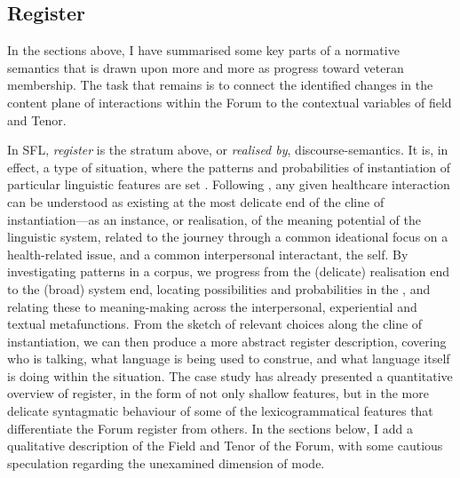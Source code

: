 \subsection{Register} \label{sect:discuss-register}

In the sections above, I have summarised some key parts of a normative semantics that is drawn upon more and more as  progress toward veteran membership. The task that remains is to connect the identified changes in the content plane of interactions within the \gls{Forum} to the contextual variables of field and Tenor.

In \gls{SFL}, \emph{register} is the stratum above, or \emph{realised by}, \glspl{discourse-semantic}. It is, in effect, a type of situation, where the patterns and probabilities of instantiation of particular linguistic features are set \cite{halliday_introduction_2004,lukin2011halliday}.
Following \textcite{matthiessen_applying_2013}, any given healthcare interaction can be understood as existing at the most delicate end of the cline of instantiation---as an instance, or realisation, of the meaning potential of the linguistic system, related to the journey through a common ideational focus on a health\hyp{}related issue, and a common interpersonal interactant, the self. By investigating patterns in a \gls{corpus}, we progress from the (delicate) realisation end to the (broad) system end, locating possibilities and probabilities in the , and relating these to meaning\hyp{}making across the interpersonal, experiential and textual metafunctions. From the sketch of relevant choices along the cline of instantiation, we can then produce a more abstract register description, covering who is talking, what language is being used to construe, and what language itself is doing within the situation. The case study has already presented a quantitative overview of register, in the form of not only shallow features, but in the more delicate syntagmatic behaviour of some of the lexicogrammatical features that differentiate the \gls{Forum} register from others. In the sections below, I add a qualitative description of the Field and Tenor of the \gls{Forum}, with some cautious speculation regarding the unexamined dimension of mode.


